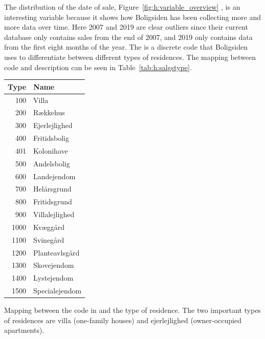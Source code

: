 The distribution of the date of sale, Figure~\ref{fig:h:variable_overview} , is an interesting variable because it shows how Boligsiden has been collecting more and more data over time. Here \num{2007} and \num{2019} are clear outliers since their current database only contains sales from the end of \num{2007}, and \num{2019} only contains data from the first eight months of the year. The  is a discrete code that Boligsiden uses to differentiate between different types of residences. The mapping between code and description can be seen in Table~\ref{tab:h:salgstype}. 

\begin{margintable}
  \centering
  \begin{tabular}{@{}rl@{}}
  Type & Name           \\ 
  \midrule
  100  & Villa          \\ 
  200  & Rækkehus       \\
  300  & Ejerlejlighed  \\
  400  & Fritidsbolig   \\
  401  & Kolonihave     \\
  500  & Andelsbolig    \\
  600  & Landejendom    \\
  700  & Helårsgrund    \\
  800  & Fritidsgrund   \\
  900  & Villalejlighed \\
  1000 & Kvæggård       \\
  1100 & Svinegård      \\
  1200 & Planteavlsgård \\
  1300 & Skovejendom    \\
  1400 & Lystejendom    \\
  1500 & Specialejendom \\ 
  \end{tabular}
  \vspace{\abovecaptionskip}
  \caption{Mapping between the code in  and the type of residence. The two important types of residences are villa (one-family houses) and ejerlejlighed (owner-occupied apartments).}
  \label{tab:h:salgstype}
\end{margintable}

